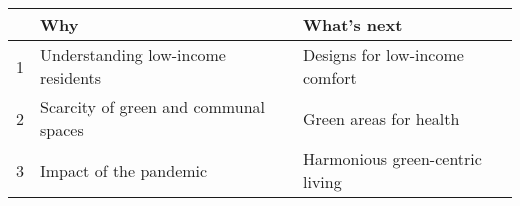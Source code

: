 \begin{table}[H]
	\renewcommand{\arraystretch}{2.25}
	\RaggedRight
	\small
	\begin{tabularx}{\linewidth}{c X X}
		  & \textbf{Why}                          & \textbf{What's next}            \\
		\midrule
		1 & Understanding low-income residents    & Designs for low-income comfort  \\
		\midrule
		2 & Scarcity of green and communal spaces & Green areas for health          \\
		\midrule
		3 & Impact of the pandemic                & Harmonious green-centric living \\
	\end{tabularx}
\end{table}
